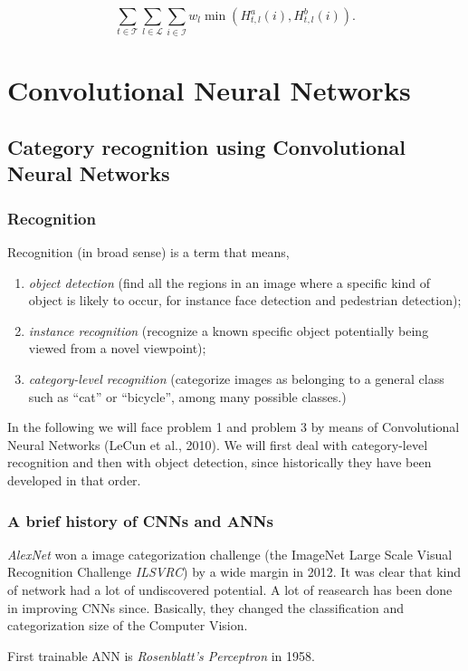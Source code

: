 \documentclass[10pt]{report}
\begin{document}
\[ \sum_{t \in \mathcal{T}} \sum_{l \in \mathcal{L}} \sum_{i \in \mathcal{I}} w_l \min{(H^a_{t,l}(i), H^b_{t,l}(i))}.\]

\chapter{Convolutional Neural Networks}
\label{sec:orgb522c61}
\section{Category recognition using Convolutional Neural Networks}
\label{sec:org70c0f42}
\subsection{Recognition}
\label{sec:org078dfa8}
Recognition (in broad sense) is a term that means,

\begin{enumerate}
\item \emph{object detection} (find all the regions in an image where a specific
kind of object is likely to occur, for instance face detection and
pedestrian detection);
\item \emph{instance recognition} (recognize a known specific object potentially
being viewed from a novel viewpoint);
\item \emph{category-level recognition} (categorize images as belonging to a
general class such as ``cat'' or ``bicycle'', among many possible
classes.)
\end{enumerate}

In the following we will face problem 1 and problem 3 by means of
Convolutional Neural Networks (LeCun et al., 2010). We will first deal
with category-level recognition and then with object detection, since
historically they have been developed in that order.

\subsection{A brief history of CNNs and ANNs}
\label{sec:orgf36b690}
\emph{AlexNet} won a image categorization challenge (the ImageNet Large Scale
Visual Recognition Challenge \emph{ILSVRC}) by a wide margin in 2012. It was
clear that kind of network had a lot of undiscovered potential. A lot of
reasearch has been done in improving CNNs since. Basically, they changed
the classification and categorization size of the Computer Vision.

First trainable ANN is \emph{Rosenblatt's Perceptron} in 1958.
\end{document}
